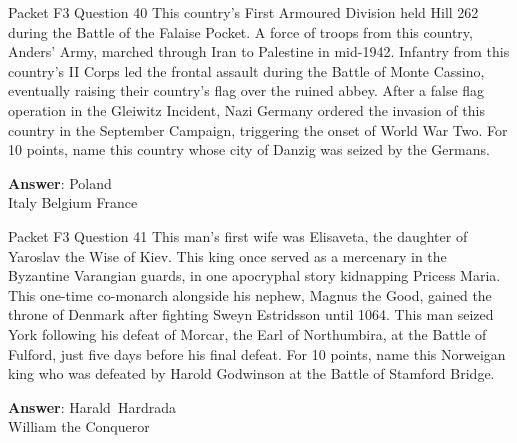 \begin{frame}{Packet F3 Question 40}
This country's First Armoured Division held Hill 262 during the Battle of the Falaise Pocket. A force of troops from this country, Anders' Army, marched through Iran to Palestine in mid-1942. Infantry from this country's II Corps led the frontal assault during the Battle of Monte Cassino, eventually raising their country's flag over the ruined abbey. After a false flag operation in the Gleiwitz Incident, Nazi Germany ordered the invasion of this country in the   September Campaign, triggering the onset of World War Two. For 10 points, name this country whose city of Danzig was seized by the Germans.      

\textbf{Answer}: Poland\\
 Italy
 Belgium
 France
\end{frame}

\begin{frame}{Packet F3 Question 41}
This man's first wife was Elisaveta, the daughter of Yaroslav the Wise of Kiev. This king once served   as a mercenary in the Byzantine Varangian guards, in one apocryphal story kidnapping Pricess Maria. This one-time co-monarch alongside his nephew, Magnus the Good,     gained the throne of Denmark after fighting   Sweyn Estridsson until 1064. This man seized York following his defeat of Morcar, the Earl of Northumbira, at the Battle of Fulford, just five days before his final defeat. For 10 points, name this Norweigan king who was defeated by Harold Godwinson at   the Battle of Stamford Bridge.

\textbf{Answer}: Harald\ Hardrada\\
 William the Conqueror
\end{frame}

